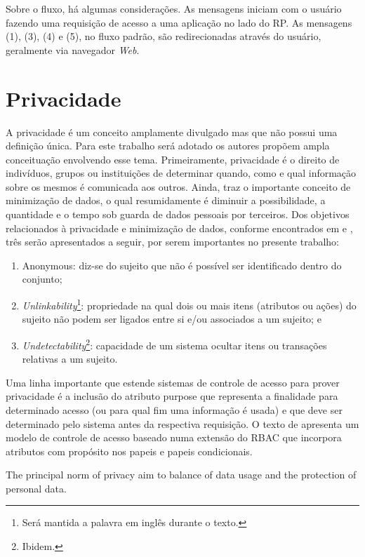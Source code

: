 \documentclass{doublecol-new}
\begin{document}
Sobre o fluxo, há algumas considerações. As mensagens iniciam com o usuário fazendo uma requisição de acesso a uma aplicação no lado do RP. As mensagens (1), (3), (4) e (5), no fluxo padrão, são redirecionadas através do usuário, geralmente via navegador \textit{Web}.

\section{Privacidade}

A privacidade é um conceito amplamente divulgado mas que não possui uma definição única. Para este trabalho será adotado os autores \cite{pfitzmann2010terminology} propõem ampla conceituação envolvendo esse tema. Primeiramente, privacidade é o direito de indivíduos, grupos ou instituições de determinar quando, como e qual informação sobre os mesmos é comunicada aos outros. Ainda, traz o importante conceito de minimização de dados, o qual resumidamente é diminuir a possibilidade, a quantidade e o tempo sob guarda de dados pessoais por terceiros. Dos objetivos relacionados à privacidade e minimização de dados, conforme encontrados em \cite{pfitzmann2010terminology} e \cite{deng2011privacy}, três serão apresentados a seguir, por serem importantes no presente trabalho:
\begin{enumerate}
	\item Anonymous: diz-se do sujeito que não é possível ser identificado dentro do conjunto;
	\item \textit{Unlinkability}\footnote{Será mantida a palavra em inglês durante o texto.}: propriedade na qual dois ou mais itens (atributos ou ações) do sujeito não podem ser ligados entre si e/ou associados a um sujeito; e
	\item \textit{Undetectability}\footnote{Ibidem.}: capacidade de um sistema ocultar itens ou transações relativas a um sujeito.
\end{enumerate}

Uma linha importante que estende sistemas de controle de acesso para prover privacidade é a inclusão do atributo purpose que representa a finalidade para determinado acesso (ou para qual fim uma informação é usada) e que deve ser determinado pelo sistema antes da respectiva requisição. O texto de \cite{byun2005purpose} apresenta um modelo de controle de acesso baseado numa extensão do RBAC que incorpora atributos com propósito nos papeis e papeis condicionais.

The principal norm of privacy aim to balance of data usage and the protection of personal data.
\end{document}
